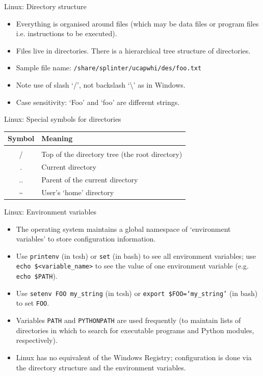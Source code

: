 \documentclass{beamer}
\begin{document}
\begin{frame}{Linux: Directory structure}
  \begin{itemize}
    \item{Everything is organised around files (which may be data files or program files i.e. instructions to be executed).}
    \item{Files live in directories. There is a hierarchical tree structure of directories.}
    \item{Sample file name: \texttt{/share/splinter/ucapwhi/des/foo.txt}}
    \item{Note use of slash `/', not backslash `\textbackslash' as in Windows.}
    \item{Case sensitivity: `Foo' and `foo' are different strings.}
  \end{itemize}
\end{frame}

\begin{frame}{Linux: Special symbols for directories}
  \begin{table}[ht]
    \centering
    \begin{tabular}{c l}
      \\ [-2ex]
      Symbol & Meaning \\ [.5ex]
      \hline \\ [-2ex]
      / & Top of the directory tree (the root directory) \\
      . & Current directory \\
      .. & Parent of the current directory \\
      \textasciitilde & User's `home' directory
    \end{tabular}
  \end{table}
\end{frame}


\begin{frame}{Linux: Environment variables}
  \begin{itemize}
    \item The operating system maintains a global namespace of `environment variables' to store configuration information.
    \item Use \alert{\texttt{printenv}} (in tcsh) or \alert{\texttt{set}} (in bash) to see all environment variables; use \alert{\texttt{echo \$<variable\_name>}} to see the value of one environment variable (e.g. \alert{\texttt{echo \$PATH}}).
    \item Use \alert{\texttt{setenv FOO my\_string}} (in tcsh) or \alert{\texttt{export \$FOO=`my\_string'}} (in bash) to set \texttt{FOO}.
    \item Variables \texttt{PATH} and \texttt{PYTHONPATH} are used frequently (to maintain lists of directories in which to search for executable programs and Python modules, respectively).
    \item Linux has no equivalent of the Windows Registry; configuration is done via the directory structure and the environment variables.
  \end{itemize}
\end{frame}
\end{document}
